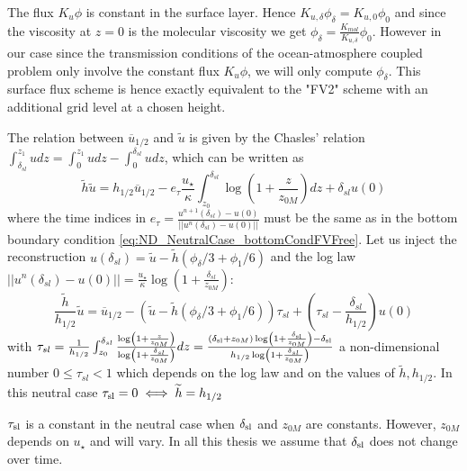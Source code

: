 \begin{remark}
	The flux $K_u \phi$ is constant in the surface layer. Hence
	$K_{u,\delta}\phi_{\delta} = K_{u,0} \phi_0$ and since the
	viscosity at $z=0$ is the molecular viscosity we get
	$\phi_{\delta} = \frac{K_{mol}}{K_{u,\delta}} \phi_0$.
	However in our case since the transmission conditions of
	the ocean-atmosphere coupled problem only involve
	the constant flux
	$K_{u} \phi$, we will only compute $\phi_{\delta}$.
	This surface flux scheme is hence exactly equivalent
	to the "FV2" scheme with an additional grid level at 
	a chosen height.
\end{remark}
\par
The relation between $\overline{u}_{1/2}$ and $\widetilde{u}$ is 
given by the Chasles' relation
$ \int_{\delta_{sl}}^{z_1} u dz = \int_0^{z_1} u dz -
\int_0^{\delta_{sl}} u dz$, which can be written as
\begin{equation}
\label{eq:ND_NeutralCase_Chasles}
	\widetilde{h}\widetilde{u} = h_{1/2}\overline{u}_{1/2} -
	e_\tau \frac{{u_\star}}{\kappa}\int_{z_0}^{\delta_{sl}}
	\log(1+\frac{z}{z_{0M}}) dz
	+ \delta_{sl} u(0)
\end{equation}
where the time indices in $e_\tau = \frac{u^{n+1}(\delta_{sl})-u(0)}
{||u^n(\delta_{sl})-u(0)||}$ must be the same as in the
bottom boundary condition
\eqref{eq:ND_NeutralCase_bottomCondFVFree}.
Let us inject the reconstruction $u(\delta_{sl}) = \widetilde{u} - \widetilde{h}(\phi_{\delta}/3 + \phi_1/6)$
and the log law $||u^n(\delta_{sl})-u(0)|| = \frac{{u_\star}}{\kappa}\log(1+\frac{\delta_{sl}}{z_{0M}})$:
\begin{equation}
	\label{eq:ND_NeutralCase_utildeExpression}
	\frac{\widetilde{h}}{h_{1/2}}\widetilde{u} = \overline{u}_{1/2} - \left(\widetilde{u} - \widetilde{h}(\phi_{\delta}/3 + \phi_1/6)
	\right)\tau_{sl} +
	(\tau_{sl} - \frac{\delta_{sl}}{h_{1/2}})u(0)
\end{equation}
with $\tau_{sl} = \frac{1}{{h_{1/2}}}\int_{z_0}^{\delta_{sl}}
\frac{\log(1+\frac{z}{z_{0M}})}{\log(1+\frac{\delta_{sl}}{z_{0M}})}dz
= \frac{(\delta_{\rm sl} + z_{0M})
\log(1+\frac{\delta_{\rm sl}}{z_{0M}}) - \delta_{\rm sl}}{
	h_{1/2}\log(1+\frac{\delta_{sl}}{z_{0M}})}$ a non-dimensional
number $0 \leq\tau_{sl} < 1$ which depends on the log law and
on the values of $\widetilde{h}, h_{1/2}$.
In this neutral case $\tau_{\rm sl} = 0 \iff \widetilde{h}=h_{1/2}$

\begin{remark}
$\tau_{\rm sl}$ is a constant in the neutral case
when $\delta_{\rm sl}$ and $z_{0M}$ are constants. However,
$z_{0M}$ depends on $u_\star$ and will vary.
In all this thesis we assume that $\delta_{\rm sl}$ does not
change over time.
\end{remark}

